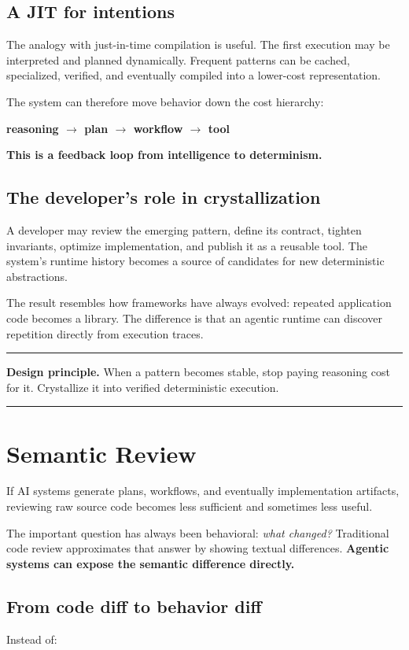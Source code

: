 \documentclass[10pt,oneside,openany]{book}
\newcommand{\principle}[1]{%
  \vspace{4pt}
  \noindent\begin{minipage}{\linewidth}
  \hrule\vspace{5pt}
  \small\sffamily\raggedright\textbf{Design principle.} #1
  \vspace{5pt}\hrule
  \end{minipage}\vspace{4pt}
}
\begin{document}
\section{A JIT for intentions}
The analogy with just-in-time compilation is useful. The first execution may be interpreted and planned dynamically. Frequent patterns can be cached, specialized, verified, and eventually compiled into a lower-cost representation.

The system can therefore move behavior down the cost hierarchy:

\begin{center}
\sffamily\bfseries
reasoning $\rightarrow$ plan $\rightarrow$ workflow $\rightarrow$ tool
\end{center}

\textbf{This is a feedback loop from intelligence to determinism.}

\section{The developer's role in crystallization}
A developer may review the emerging pattern, define its contract, tighten invariants, optimize implementation, and publish it as a reusable tool. The system's runtime history becomes a source of candidates for new deterministic abstractions.

The result resembles how frameworks have always evolved: repeated application code becomes a library. The difference is that an agentic runtime can discover repetition directly from execution traces.

\principle{When a pattern becomes stable, stop paying reasoning cost for it. Crystallize it into verified deterministic execution.}

\chapter{Semantic Review}

If AI systems generate plans, workflows, and eventually implementation artifacts, reviewing raw source code becomes less sufficient and sometimes less useful.

The important question has always been behavioral: \emph{what changed?} Traditional code review approximates that answer by showing textual differences. \textbf{Agentic systems can expose the semantic difference directly.}

\section{From code diff to behavior diff}
Instead of:
\end{document}
